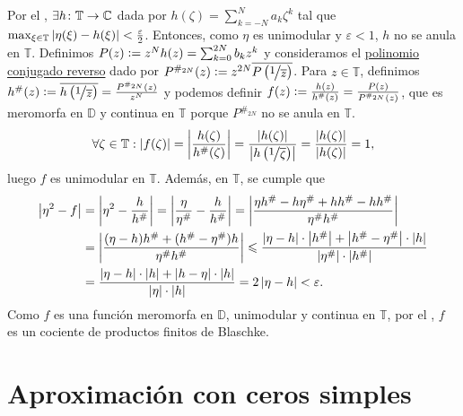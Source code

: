 \begin{dem}
    Por el ,
    $\exists h \colon \mathbb{T} \to \mathbb{C}$ dada por $h(\zeta) = \sum_{k=-N}^N a_k \zeta^k$ tal que $\max_{\xi \in \mathbb{T}} \left|\eta(\xi) - h(\xi)\right| < \frac{\varepsilon}{2}$. Entonces, como $\eta$ es unimodular y $\varepsilon < 1$, $h$ no se anula en $\mathbb{T}$. Definimos $P(z) \vcentcolon= z^N h(z) = \sum_{k=0}^{2N} b_k z^k$ y consideramos el \hyperref[defn:polinomio-conjugado-reverso]{polinomio conjugado reverso} dado por $P^{\#_{2N}}(z) \defeq z^{2N} \bar{P\left(\sfrac{1}{\bar{z}}\right)}$. Para $z \in \mathbb{T}$, definimos $h^{\#}(z) \defeq \bar{h\left(\sfrac{1}{\bar{z}}\right)} = \frac{P^{\#_{2N}}(z)}{z^N}$ y podemos definir $f(z) \vcentcolon= \frac{h(z)}{h^{\#}(z)} = \frac{P(z)}{P^{\#_{2N}}(z)}$, que es meromorfa en $\mathbb{D}$ y continua en $\mathbb{T}$ porque $P^{\#_{2N}}$ no se anula en $\mathbb{T}$.
    \[
    \begin{aligned}
        \forall \zeta \in \mathbb{T} : \abs{f(\zeta)} = \abs{\frac{h(\zeta)}{h^{\#}(\zeta)}} = \frac{\abs{h(\zeta)}}{\abs{h \left(\sfrac{1}{\bar{\zeta}}\right)}} = \frac{\abs{h(\zeta)}}{\abs{h(\zeta)}} = 1,
    \end{aligned}
    \]
    luego $f$ es unimodular en $\mathbb{T}$. Además, en $\mathbb{T}$, se cumple que
    \[
    \begin{aligned}
        \left|\eta^2 - f\right| &= \left|\eta^2 - \frac{h}{h^{\#}}\right| = \left|\frac{\eta}{\eta^{\#}} - \frac{h}{h^{\#}}\right| = \left|\frac{\eta h^{\#} - h \eta^{\#} + hh^{\#} - hh^{\#}}{\eta^{\#} h^{\#}}\right| \\
        &= \left|\frac{(\eta - h)h^{\#} + (h^{\#} - \eta^{\#})h}{\eta^{\#} h^{\#}}\right| \leqslant \frac{\left|\eta - h\right| \cdot \left|h^{\#}\right| + \left|h^{\#} - \eta^{\#}\right| \cdot \left|h\right|}{\left|\eta^{\#}\right| \cdot \left|h^{\#}\right|} \\
        &= \frac{\left|\eta - h\right| \cdot \left|h\right| + \left|h - \eta\right| \cdot \left|h\right|}{\left|\eta\right| \cdot \left|h\right|} = 2 \left|\eta - h\right| < \varepsilon.
    \end{aligned}
    \]
    Como $f$ es una función meromorfa en $\mathbb{D}$, unimodular y continua en $\mathbb{T}$, por el , $f$ es un cociente de productos finitos de Blaschke.\hfill\qedsymbol
\end{dem}

\section{Aproximación con ceros simples}

